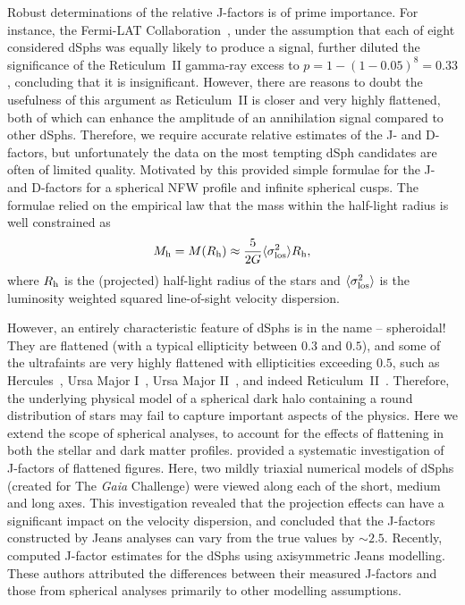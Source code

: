 \documentclass[prd,twocolumn,showpacs,preprintnumbers,superscriptaddress,nofootinbib,amsmath,amssymb,nobalancelastpage]{revtex4}
\def\rh{R_{\rm h}}
\def\Mh{M_{\rm h}}
\begin{document}
Robust determinations of the relative J-factors is of prime
importance. For instance, the Fermi-LAT
Collaboration~\cite{2015ApJ...809L...4D}, under the assumption that
each of eight considered dSphs was equally likely to produce a signal,
further diluted the significance of the Reticulum~II gamma-ray excess to $p=1 - (1-0.05)^8 = 0.33$, concluding that it is
insignificant. However, there are reasons to doubt the usefulness of
this argument as Reticulum~II is closer and very highly flattened,
both of which can enhance the amplitude of an annihilation signal compared
to other dSphs. Therefore, we require accurate relative estimates of the J- and D-factors, but unfortunately the
data on the most tempting dSph candidates are often of limited quality. Motivated
by this \cite[][~hereafter Paper I]{EvansSandersGS} provided simple formulae for
the J- and D-factors for a spherical NFW profile and infinite
spherical cusps. The formulae relied on the empirical law that the
mass within the half-light radius is well constrained as \citep{Wa09,Wo10}
%
\begin{equation}
\Mh=M(\rh)\approx \frac{5}{2G}\langle\sigma_{\rm los}^2\rangle \rh,
\label{eq:wolf}
\end{equation}
%
where $\rh$ is the (projected) half-light radius of the stars and
$\langle\sigma_{\rm los}^2\rangle$ is the luminosity weighted squared line-of-sight velocity dispersion.

However, an entirely characteristic feature of dSphs is in the name --
spheroidal! They are flattened (with a typical ellipticity between $0.3$ and $0.5$), and some of the ultrafaints are very
highly flattened with ellipticities exceeding $0.5$, such as
Hercules~\citep{De12}, Ursa Major I~\citep{Ma08}, Ursa Major
II~\citep{Zu06}, and indeed Reticulum~II~\citep{Ko15}. Therefore, the
underlying physical model of a spherical dark halo containing a round
distribution of stars may fail to capture important aspects of the
physics. Here we extend the scope of spherical analyses, to account
for the effects of flattening in both the stellar and dark matter
profiles. \citet{Bo15d} provided a systematic investigation of J-factors of flattened figures. Here, two mildly triaxial numerical
models of dSphs (created for The {\it Gaia} Challenge) were viewed
along each of the short, medium and long axes. This investigation
revealed that the projection effects can have a significant impact on
the velocity dispersion, and concluded that the J-factors constructed
by Jeans analyses can vary from the true values by $\sim 2.5$. Recently, \cite{Hayashi2016} computed J-factor estimates for the dSphs using axisymmetric Jeans modelling. These authors attributed the differences between their measured J-factors and those from spherical analyses primarily to other modelling assumptions.
\end{document}
